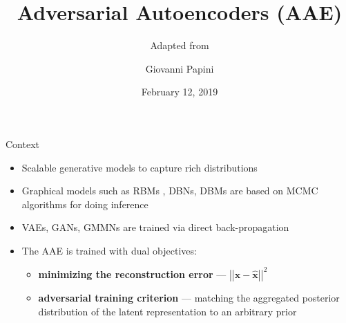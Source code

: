\documentclass[10pt]{beamer}
\newcommand{\vect}[1]{\boldsymbol{#1}} %
\begin{document}
\author{Giovanni Papini}
\title{Adversarial Autoencoders (AAE)}
\subtitle{Adapted from \cite{makhzani2015adversarial}}
\date{February 12, 2019}
\subject{autoencoders, neural network, AI}

\begin{frame}[plain]
\maketitle
\end{frame}


\begin{frame}{Context}
\begin{itemize}
  \item Scalable generative models to capture rich distributions
  \item Graphical models such as RBMs , DBNs, DBMs are based on MCMC algorithms for doing inference
  \item VAEs, GANs, GMMNs are trained via direct back-propagation
  \item The AAE is trained with dual objectives:
  \begin{itemize}
    \item \textbf{minimizing the reconstruction error} — $ \left|\left|\vect x - \hat{\vect x}\right|\right| ^2 $
    \item \textbf{adversarial training criterion} — matching the aggregated posterior distribution of the latent representation to an arbitrary prior
  \end{itemize}
\end{itemize}
\end{frame}
\end{document}
